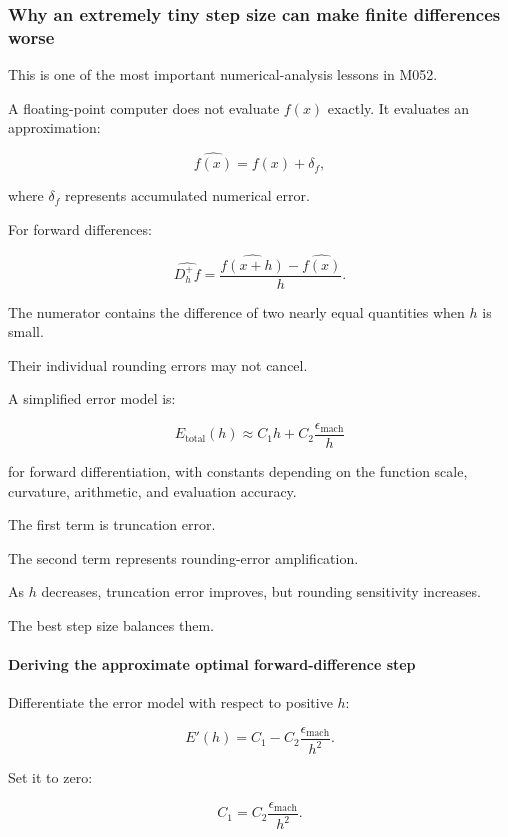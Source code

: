 \subsubsection{Why an extremely tiny step size can make finite differences worse}\label{02-foundations-ii-ch025-why-an-extremely-tiny-step-size-can-make-finite-differences-worse}

This is one of the most important numerical-analysis lessons in M052.

A floating-point computer does not evaluate \(f(x)\) exactly. It evaluates an approximation:

\[
\widehat{f(x)}=f(x)+\delta_f,
\]

where \(\delta_f\) represents accumulated numerical error.

For forward differences:

\[
\widehat{D_h^+f} = \frac{\widehat{f(x+h)}-\widehat{f(x)}}h.
\]

The numerator contains the difference of two nearly equal quantities when \(h\) is small.

Their individual rounding errors may not cancel.

A simplified error model is:

\[
\boxed{ E_{\mathrm{total}}(h) \approx C_1h+C_2\frac{\epsilon_{\mathrm{mach}}}{h} }
\]

for forward differentiation, with constants depending on the function scale, curvature, arithmetic, and evaluation accuracy.

The first term is truncation error.

The second term represents rounding-error amplification.

As \(h\) decreases, truncation error improves, but rounding sensitivity increases.

The best step size balances them.

\paragraph{Deriving the approximate optimal forward-difference step}\label{02-foundations-ii-ch025-deriving-the-approximate-optimal-forward-difference-step}

Differentiate the error model with respect to positive \(h\):

\[
E'(h)= C_1- C_2\frac{\epsilon_{\mathrm{mach}}}{h^2}.
\]

Set it to zero:

\[
C_1= C_2\frac{\epsilon_{\mathrm{mach}}}{h^2}.
\]

